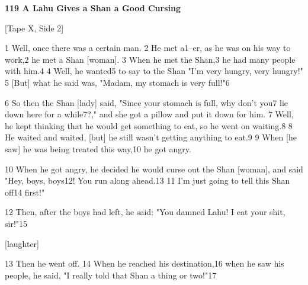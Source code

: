 
\textbf{119 A Lahu Gives a Shan a Good Cursing}

[Tape X, Side 2]

1 Well, once there was a certain man. 2 He met a1--er, as he was on his way to
work,2 he met a Shan [woman]. 3 When he met the Shan,3 he had many people with
him.4 4 Well, he wanted5 to say to the Shan "I'm very hungry, very hungry!"
5 [But] what he said was, "Madam, my stomach is very full!"6

6 So then the Shan [lady] said, "Since your stomach is full, why don't
you7 lie down here for a while7?," and she got a pillow and put it down
for him. 7 Well, he kept thinking that he would get something to eat, so he went
on waiting.8 8 He waited and waited, [but] he still wasn't getting anything to
eat.9 9 When [he saw] he was being treated this way,10 he got angry.

10 When he got angry, he decided he would curse out the Shan [woman], and said
"Hey, boys, boys12! You run along ahead.13 11 I'm just going to tell this
Shan off14 first!"

12 Then, after the boys had left, he said: "You damned Lahu! I eat your
shit, sir!"15

[laughter]

13 Then he went off. 14 When he reached his destination,16 when he saw his people,
he said, "I really told that Shan a thing or two!"17

